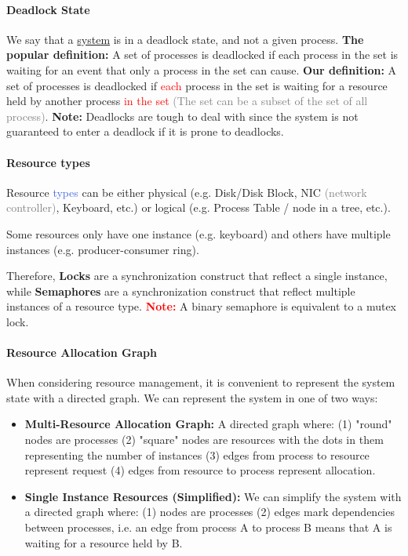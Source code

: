 \documentclass[openany,12pt]{book}
\newcommand{\red}[1]{\textcolor{Red}{#1}}
\newcommand{\blue}[1]{\textcolor{RoyalBlue}{#1}}
\newcommand{\gray}[1]{\textcolor{gray}{#1}}
\begin{document}
\paragraph{Deadlock State} We say that a \ul{system} is in a deadlock state, and not a given process. \textbf{The popular definition:} A set of processes is deadlocked if each process in the set is waiting for an event that only a process in the set can cause. \textbf{Our definition:} A set of processes is deadlocked if \red{each} process in the set is waiting for a resource held by another process \red{in the set} \gray{(The set can be a subset of the set of all process)}. \textbf{Note:} Deadlocks are tough to deal with since the system is not guaranteed to enter a deadlock if it is prone to deadlocks.

\paragraph{Resource types} Resource \blue{types} can be either physical (e.g. Disk/Disk Block, NIC \gray{(network controller)}, Keyboard, etc.) or logical (e.g. Process Table / node in a tree, etc.).

Some resources only have one instance (e.g. keyboard) and others have multiple instances (e.g. producer-consumer ring).

Therefore, \textbf{Locks} are a synchronization construct that reflect a single instance, while \textbf{Semaphores} are a synchronization construct that reflect multiple instances of a resource type. \red{\textbf{Note:}} A binary semaphore is equivalent to a mutex lock.

\paragraph{Resource Allocation Graph} When considering resource management, it is convenient to represent the system state with a directed graph. We can represent the system in one of two ways:
\begin{itemize}
    \item \textbf{Multi-Resource Allocation Graph:} A directed graph where: (1) "round" nodes are processes (2) "square" nodes are resources with the dots in them representing the number of instances (3) edges from process to resource represent request (4) edges from resource to process represent allocation.

    \item \textbf{Single Instance Resources (Simplified):} We can simplify the system with a directed graph where: (1) nodes are processes (2) edges mark dependencies between processes, i.e. an edge from process A to process B means that A is waiting for a resource held by B.

\end{itemize}
\end{document}
